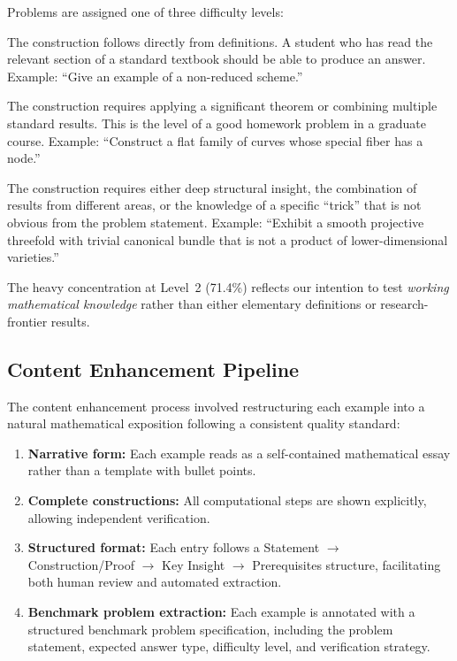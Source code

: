 Problems are assigned one of three difficulty levels:
\begin{description}[nosep]
  \item[Level 1 (Routine, 77 problems):] The construction follows directly from definitions. A student who has read the relevant section of a standard textbook should be able to produce an answer. Example: ``Give an example of a non-reduced scheme.''
  \item[Level 2 (Non-trivial, 237 problems):] The construction requires applying a significant theorem or combining multiple standard results. This is the level of a good homework problem in a graduate course. Example: ``Construct a flat family of curves whose special fiber has a node.''
  \item[Level 3 (Deep, 18 problems):] The construction requires either deep structural insight, the combination of results from different areas, or the knowledge of a specific ``trick'' that is not obvious from the problem statement. Example: ``Exhibit a smooth projective threefold with trivial canonical bundle that is not a product of lower-dimensional varieties.''
\end{description}

The heavy concentration at Level~2 (71.4\%) reflects our intention to test \emph{working mathematical knowledge} rather than either elementary definitions or research-frontier results.

\subsection{Content Enhancement Pipeline}

The content enhancement process involved restructuring each example into a natural mathematical exposition following a consistent quality standard:
\begin{enumerate}[nosep]
  \item \textbf{Narrative form:} Each example reads as a self-contained mathematical essay rather than a template with bullet points.
  \item \textbf{Complete constructions:} All computational steps are shown explicitly, allowing independent verification.
  \item \textbf{Structured format:} Each entry follows a Statement $\to$ Construction/Proof $\to$ Key Insight $\to$ Prerequisites structure, facilitating both human review and automated extraction.
  \item \textbf{Benchmark problem extraction:} Each example is annotated with a structured benchmark problem specification, including the problem statement, expected answer type, difficulty level, and verification strategy.
\end{enumerate}

